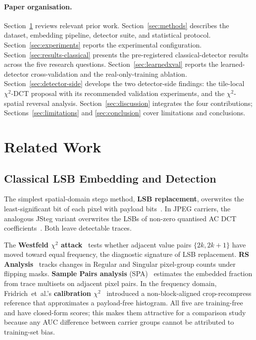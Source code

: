 \documentclass[10pt,twocolumn,a4paper]{article}
\begin{document}
\paragraph{Paper organisation.} Section~\ref{sec:relatedwork} reviews relevant prior work. Section~\ref{sec:methods} describes the dataset, embedding pipeline, detector suite, and statistical protocol. Section~\ref{sec:experiments} reports the experimental configuration. Section~\ref{sec:results-classical} presents the pre-registered classical-detector results across the five research questions. Section~\ref{sec:learnedxval} reports the learned-detector cross-validation and the real-only-training ablation. Section~\ref{sec:detector-side} develops the two detector-side findings: the tile-local $\chi^2$-DCT proposal with its recommended validation experiments, and the $\chi^2$-spatial reversal analysis. Section~\ref{sec:discussion} integrates the four contributions; Sections~\ref{sec:limitations} and \ref{sec:conclusion} cover limitations and conclusions.

\section{Related Work}
\label{sec:relatedwork}

\subsection{Classical LSB Embedding and Detection}
The simplest spatial-domain stego method, \textbf{LSB replacement}, overwrites the least-significant bit of each pixel with payload bits~\cite{petitcolas1999,hussain2018}. In JPEG carriers, the analogous JSteg variant overwrites the LSBs of non-zero quantised AC DCT coefficients~\cite{westfeld1999chi,fridrich2003calib}. Both leave detectable traces.

The \textbf{Westfeld $\chi^2$ attack}~\cite{westfeld1999chi} tests whether adjacent value pairs $\{2k,2k\!+\!1\}$ have moved toward equal frequency, the diagnostic signature of LSB replacement. \textbf{RS Analysis}~\cite{fridrich2001lsb} tracks changes in Regular and Singular pixel-group counts under flipping masks. \textbf{Sample Pairs analysis} (SPA)~\cite{dumitrescu2003sp} estimates the embedded fraction from trace multisets on adjacent pixel pairs. In the frequency domain, Fridrich~et~al.'s \textbf{calibration $\chi^2$}~\cite{fridrich2003calib} introduced a non-block-aligned crop-recompress reference that approximates a payload-free histogram. All five are training-free and have closed-form scores; this makes them attractive for a comparison study because any AUC difference between carrier groups cannot be attributed to training-set bias.
\end{document}
